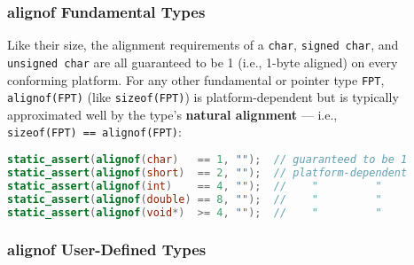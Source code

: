 \subsubsection[\tt{alignof} Fundamental Types]{{\SubsubsecCode alignof} Fundamental Types}\label{alignof-fundamental-types}

Like their size, the alignment requirements of a \texttt{char},
\texttt{signed}~\texttt{char}, and \texttt{unsigned}~\texttt{char} are
all guaranteed to be 1 (i.e., 1-byte aligned) on every conforming
platform. For any other fundamental or pointer type \texttt{FPT},
\texttt{alignof(FPT)} (like \texttt{sizeof(FPT)}) is platform-dependent but is typically approximated well by the type's \textbf{natural
alignment} --- i.e.,
\texttt{sizeof(FPT)}~\texttt{==}~\texttt{alignof(FPT)}:

\begin{lstlisting}[language=C++]
static_assert(alignof(char)   == 1, "");  // guaranteed to be 1
static_assert(alignof(short)  == 2, "");  // platform-dependent
static_assert(alignof(int)    == 4, "");  //    "         "
static_assert(alignof(double) == 8, "");  //    "         "
static_assert(alignof(void*)  >= 4, "");  //    "         "
\end{lstlisting}
    

\subsubsection[\tt{alignof} User-Defined Types]{{\SubsubsecCode alignof} User-Defined Types}\label{alignof-user-defined-types}


